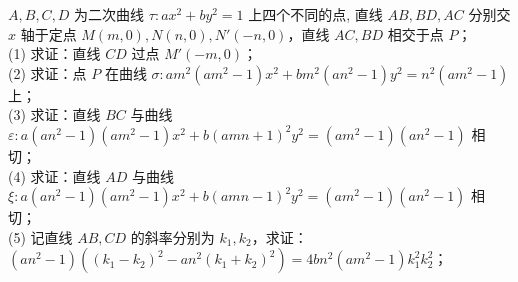 \begin{example}
 $A,B,C,D$ 为二次曲线 $\tau: ax^2+by^2=1$ 上四个不同的点, 直线 $AB,BD,AC$ 分别交 $x$ 轴于定点 $M(m,0),N(n,0),N'(-n,0)$，直线 $AC,BD$ 相交于点 $P$；\\
(1) 求证：直线 $CD$ 过点 $M'(-m,0)$；\\
(2) 求证：点 $P$ 在曲线 $\sigma: am^2(am^2-1)x^2+bm^2(an^2-1)y^2=n^2(am^2-1)$ 上；\\
(3) 求证：直线 $BC$ 与曲线 $\varepsilon: a(an^2-1)(am^2-1)x^2+b(amn+1)^2y^2=(am^2-1)(an^2-1)$ 相切；\\
(4) 求证：直线 $AD$ 与曲线 $\xi: a(an^2-1)(am^2-1)x^2+b(amn-1)^2y^2=(am^2-1)(an^2-1)$ 相切；\\
(5) 记直线 $AB,CD$ 的斜率分别为 $k_1,k_2$，求证：$(an^2-1)((k_1-k_2)^2-an^2(k_1+k_2)^2)=4bn^2(am^2-1)k_1^2k_2^2$；
\end{example}
